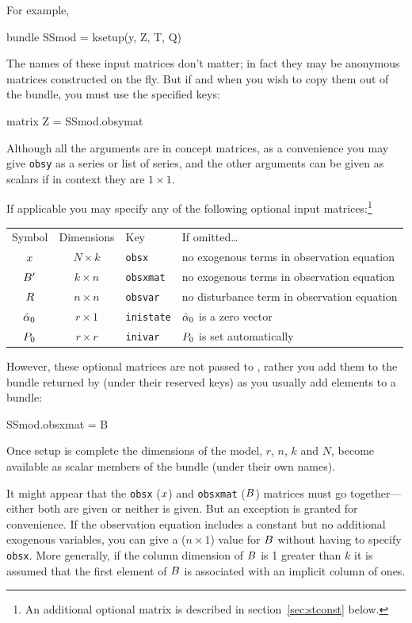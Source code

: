 For example,
\begin{code}
bundle SSmod = ksetup(y, Z, T, Q)
\end{code} 

The names of these input matrices don't matter; in fact they may be
anonymous matrices constructed on the fly. But if and when you wish to
copy them out of the bundle, you must use the specified keys:
\begin{code}
matrix Z = SSmod.obsymat
\end{code}

Although all the arguments are in concept matrices, as a convenience
you may give \texttt{obsy} as a series or list of series, and the
other arguments can be given as scalars if in context they are
$1 \times 1$.

If applicable you may specify any of the following optional input
matrices:\footnote{An additional optional matrix is described in
section~\ref{sec:stconst} below.}

\begin{center}
\begin{tabular}{ccll}
Symbol & Dimensions & Key & If omitted\dots \\[6pt]
$x$ & $N \times k$ & \texttt{obsx} &
 no exogenous terms in observation equation\\
$B'$ & $k \times n$ & \texttt{obsxmat} &
 no exogenous terms in observation equation\\ 
$R$ & $n \times n$ & \texttt{obsvar} & 
 no disturbance term in observation equation \\
$\hat{\alpha}_0$ & $r \times 1$ & \texttt{inistate} &
 $\hat{\alpha}_0$ is a zero vector\\
$P_0$ & $r \times r$ & \texttt{inivar} &
 $P_0$ is set automatically
\end{tabular}
\end{center}

However, these optional matrices are not passed to ,
rather you add them to the bundle returned by  (under
their reserved keys) as you usually add elements to a bundle:
\begin{code}
SSmod.obsxmat = B
\end{code}

Once setup is complete the dimensions of the model, $r$, $n$, $k$ and
$N$, become available as scalar members of the bundle (under their own
names).

It might appear that the \texttt{obsx} ($x$) and \texttt{obsxmat}
($B$) matrices must go together---either both are given or
neither is given.  But an exception is granted for convenience.  If
the observation equation includes a constant but no additional
exogenous variables, you can give a ($n \times 1$) value for
$B$ without having to specify \texttt{obsx}.  More generally,
if the column dimension of $B$ is 1 greater than $k$ it is
assumed that the first element of $B$ is associated with an
implicit column of ones.

